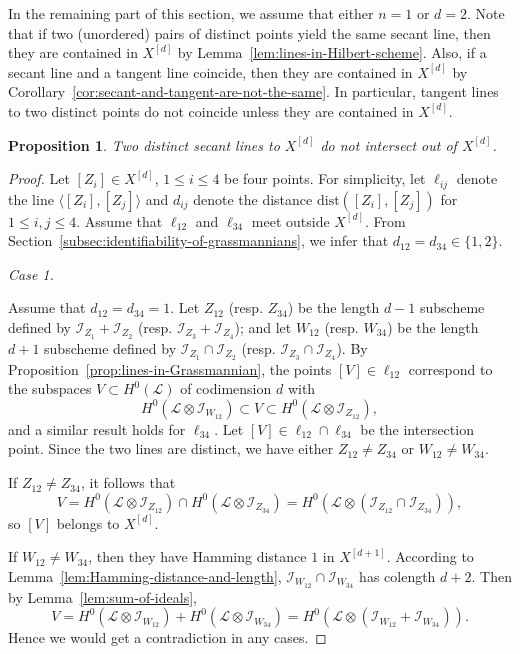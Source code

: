 \documentclass[a4paper]{amsart}
\numberwithin{equation}{section}
\theoremstyle{plain}
\newtheorem{prop}[thm]{Proposition}
\theoremstyle{definition}
\theoremstyle{remark}
\numberwithin{figure}{section}
\numberwithin{table}{section}
\numberwithin{equation}{section}
\def \Ical {\mathcal{I}}
\def \Lcal {\mathcal{L}}
\begin{document}
In the remaining part of this section, we assume that either $n = 1$ or $d = 2$.
Note that if two (unordered) pairs of distinct points yield the same secant line, then they are contained in $X^{[d]}$ by Lemma~\ref{lem:lines-in-Hilbert-scheme}.
Also, if a secant line and a tangent line coincide, then they are contained in $X^{[d]}$ by Corollary~\ref{cor:secant-and-tangent-are-not-the-same}.
In particular, tangent lines to two distinct points do not coincide unless they are contained in $X^{[d]}$.

\begin{prop} \label{prop:Secant-lines-intersect}
    Two distinct secant lines to $X^{[d]}$ do not intersect out of $X^{[d]}$.
\end{prop}

\begin{proof}
Let $[Z_i] \in X^{[d]}$, $1 \leq i \leq 4$ be four points.
For simplicity, let $\ell_{ij}$ denote the line $\langle [Z_i], [Z_j] \rangle$ and $d_{ij}$ denote the distance $\mathrm{dist}([Z_i], [Z_j])$ for $1 \leq i, j \leq 4$.
Assume that $\ell_{12}$ and $\ell_{34}$ meet outside $X^{[d]}$.
From Section~\ref{subsec:identifiability-of-grassmannians}, we infer that $d_{12} = d_{34} \in \{ 1,2 \}$.

\hypertarget{Case1-1}{\textit{Case 1.}} Assume that 
$d_{12} = d_{34} = 1$.
Let $Z_{12}$ (resp. $Z_{34}$) be the length $d-1$ subscheme defined by $\Ical_{Z_1} + \Ical_{Z_2}$ (resp. $\Ical_{Z_3} + \Ical_{Z_4}$); and let $W_{12}$ (resp. $W_{34}$) be the length $d+1$ subscheme defined by $\Ical_{Z_1} \cap \Ical_{Z_2}$ (resp. $\Ical_{Z_3} \cap \Ical_{Z_4}$).
By Proposition~\ref{prop:lines-in-Grassmannian}, the points $[V] \in \ell_{12}$ correspond to the subspaces $V \subset H^0(\Lcal)$ of codimension $d$ with
 \[
  H^0(\Lcal \otimes \Ical_{W_{12}}) \subset V \subset H^0(\Lcal \otimes \Ical_{Z_{12}}),
 \]
and a similar result holds for $\ell_{34}$.
Let $[V] \in \ell_{12} \cap \ell_{34}$ be the intersection point.
Since the two lines are distinct, we have either $Z_{12} \neq Z_{34}$ or $W_{12} \neq W_{34}$.

If $Z_{12} \neq Z_{34}$, it follows that
 \[
  V = H^0(\Lcal \otimes \Ical_{Z_{12}}) \cap H^0(\Lcal \otimes \Ical_{Z_{34}})
    = H^0(\Lcal \otimes (\Ical_{Z_{12}} \cap \Ical_{Z_{34}})),
 \]
so $[V]$ belongs to $X^{[d]}$.

If $W_{12} \neq W_{34}$, then they have Hamming distance $1$ in $X^{[d+1]}$.
According to Lemma~\ref{lem:Hamming-distance-and-length}, $\Ical_{W_{12}} \cap \Ical_{W_{34}}$ has colength $d+2$.
Then by Lemma~\ref{lem:sum-of-ideals}, 
 \[
  V = H^0(\Lcal \otimes \Ical_{W_{12}}) + H^0(\Lcal \otimes \Ical_{W_{34}}) = H^0(\Lcal \otimes (\Ical_{W_{12}} + \Ical_{W_{34}})).
 \]
Hence we would get a contradiction in any cases.


\end{proof}
\end{document}
